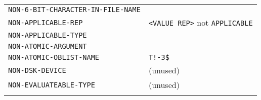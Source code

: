 \documentclass[a4paper]{scrbook}
\begin{document}
\begin{longtable}[]{@{}ll@{}}
\begin{minipage}[t]{0.58\columnwidth}
\texttt{NON-6-BIT-CHARACTER-IN-FILE-NAME}\strut
\end{minipage} & \begin{minipage}[t]{0.36\columnwidth}\raggedright\strut
\strut
\end{minipage}\tabularnewline
\begin{minipage}[t]{0.58\columnwidth}\raggedright\strut
\texttt{NON-APPLICABLE-REP}\strut
\end{minipage} & \begin{minipage}[t]{0.36\columnwidth}\raggedright\strut
\texttt{\textless{}VALUE\ REP\textgreater{}} not \texttt{APPLICABLE}\strut
\end{minipage}\tabularnewline
\begin{minipage}[t]{0.58\columnwidth}\raggedright\strut
\texttt{NON-APPLICABLE-TYPE}\strut
\end{minipage} & \begin{minipage}[t]{0.36\columnwidth}\raggedright\strut
\strut
\end{minipage}\tabularnewline
\begin{minipage}[t]{0.58\columnwidth}\raggedright\strut
\texttt{NON-ATOMIC-ARGUMENT}\strut
\end{minipage} & \begin{minipage}[t]{0.36\columnwidth}\raggedright\strut
\strut
\end{minipage}\tabularnewline
\begin{minipage}[t]{0.58\columnwidth}\raggedright\strut
\texttt{NON-ATOMIC-OBLIST-NAME}\strut
\end{minipage} & \begin{minipage}[t]{0.36\columnwidth}\raggedright\strut
\texttt{T!-3\$}\strut
\end{minipage}\tabularnewline
\begin{minipage}[t]{0.58\columnwidth}\raggedright\strut
\texttt{NON-DSK-DEVICE}\strut
\end{minipage} & \begin{minipage}[t]{0.36\columnwidth}\raggedright\strut
(unused)\strut
\end{minipage}\tabularnewline
\begin{minipage}[t]{0.58\columnwidth}\raggedright\strut
\texttt{NON-EVALUATEABLE-TYPE}\strut
\end{minipage} & \begin{minipage}[t]{0.36\columnwidth}\raggedright\strut
(unused)\strut
\end{minipage}\tabularnewline
\begin{minipage}[t]{0.58\columnwidth}\raggedright\strut

\end{minipage}
\end{longtable}
\end{document}
